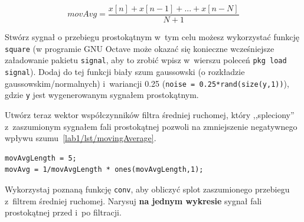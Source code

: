 \begin{equation}\label{lab1/eq/movingAverage}
movAvg = \frac{x[n] + x[n-1] + ... + x[n-N]}{N+1}
\end{equation}

Stwórz sygnał o przebiegu prostokątnym w~tym celu możesz wykorzystać funkcję \texttt{square} (w programie GNU Octave może okazać się konieczne wcześniejsze załadowanie pakietu \texttt{signal}, aby to zrobić wpisz w~wierszu poleceń \texttt{pkg load signal}). Dodaj do tej funkcji biały szum gaussowski (o rozkładzie gaussowskim/normalnych) i~wariancji 0.25 (\texttt{noise = 0.25*rand(size(y,1))}), gdzie \texttt{y} jest wygenerowanym sygnałem prostokątnym.

Utwórz teraz wektor współczynników filtra średniej ruchomej, który ,,spleciony'' z~zaszumionym sygnałem fali prostokątnej pozwoli na zmniejszenie negatywnego wpływu szumu~\ref{lab1/lst/movingAverage}.
\begin{lstlisting}[label=lab1/lst/movingAverage, caption = Przykładowe współczynniki filtra średniej ruchomej]
movAvgLength = 5;
movAvg = 1/movAvgLength * ones(movAvgLength,1);
\end{lstlisting}

Wykorzystaj poznaną funkcję \texttt{conv}, aby obliczyć splot zaszumionego przebiegu z~filtrem średniej ruchomej. Narysuj \textbf{na jednym wykresie} sygnał fali prostokątnej przed i~po filtracji.
 
%




